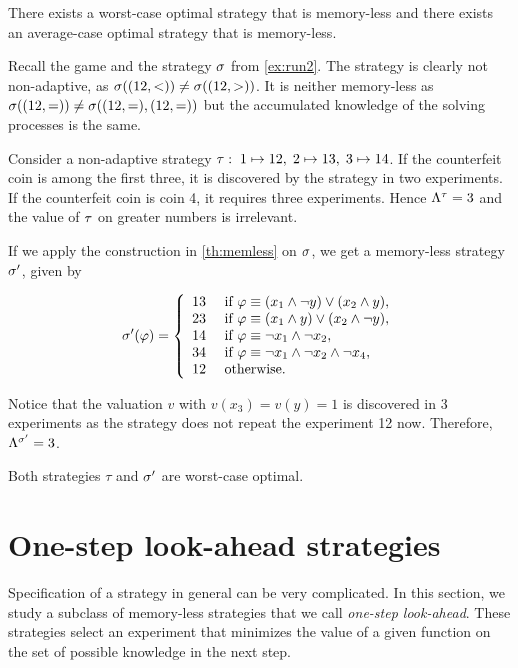 \begin{corollary}
There exists a worst-case optimal strategy that is memory-less
and there exists an average-case optimal strategy that is memory-less.
\end{corollary}

\begin{example}
Recall the game and the strategy $\sigma$ from \autoref{ex:run2}.
The strategy is clearly not non-adaptive, as
  $\sigma((12, <)) \not= \sigma((12, >))$.
It is neither memory-less as
  $\sigma((12, =)) \not= \sigma((12,=),(12,=))$ but
  the accumulated knowledge of the solving processes is the same.

Consider a non-adaptive strategy
 $\tau:\; 1 \mapsto 12,\; 2\mapsto 13,\; 3\mapsto 14$.
If the counterfeit coin is among the first three,
  it is discovered by the strategy in two experiments.
If the counterfeit coin is coin 4, it requires three experiments.
Hence $\Lambda^{\tau} = 3$ and the value of $\tau$ on
  greater numbers is irrelevant.

If we apply the construction in \autoref{th:memless} on $\sigma$,
we get a memory-less strategy $\sigma'$, given by

\[
\sigma'(\varphi) = \left\{\begin{array}{ll}
13 & \textrm{ if } \varphi \equiv (x_1 \wedge \neg y) \vee (x_2 \wedge y), \\
23 & \textrm{ if } \varphi \equiv (x_1 \wedge y) \vee (x_2 \wedge \neg y),\\
14 & \textrm{ if } \varphi \equiv \neg x_1 \wedge \neg x_2, \\
34 & \textrm{ if } \varphi \equiv \neg x_1 \wedge \neg x_2 \wedge \neg x_4, \\
12 & \textrm{ otherwise.}
\end{array}\right.
\]

Notice that the valuation $v$ with $v(x_3) = v(y) = 1$ is discovered in
  3 experiments as the strategy does not repeat the experiment 12 now.
Therefore, $\Lambda^{\sigma'} = 3$.

Both strategies $\tau$ and $\sigma'$ are worst-case optimal. \eqed
\end{example}

\section{One-step look-ahead strategies} \label{sec:oslas}

Specification of a strategy in general can be very complicated.
In this section, we study a subclass of memory-less strategies that we call
  \emph{one-step look-ahead}.
These strategies select an experiment that
  minimizes the value of a given function
  on the set of possible knowledge in the next step.

